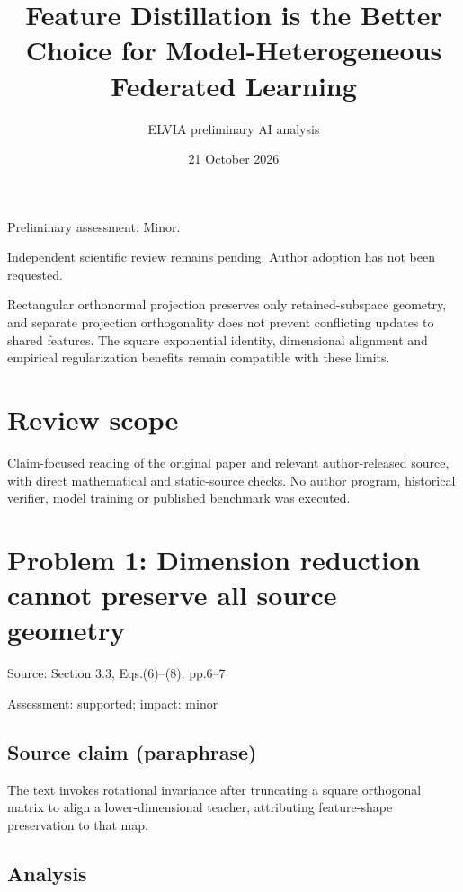 \documentclass[11pt]{article}
\begin{document}
\title{Feature Distillation is the Better Choice for Model-Heterogeneous Federated Learning}

\author{ELVIA preliminary AI analysis}\date{21 October 2026}\maketitle

Preliminary assessment: Minor.\par

Independent scientific review remains pending. Author adoption has not been requested.

Rectangular orthonormal projection preserves only retained-subspace geometry, and separate projection orthogonality does not prevent conflicting updates to shared features. The square exponential identity, dimensional alignment and empirical regularization benefits remain compatible with these limits.

\section*{Review scope}

Claim-focused reading of the original paper and relevant author-released source, with direct mathematical and static-source checks. No author program, historical verifier, model training or published benchmark was executed.

\section*{Problem 1: Dimension reduction cannot preserve all source geometry}

Source: Section 3.3, Eqs.(6)–(8), pp.6–7

Assessment: supported; impact: minor

\subsection*{Source claim (paraphrase)}

The text invokes rotational invariance after truncating a square orthogonal matrix to align a lower-dimensional teacher, attributing feature-shape preservation to that map.

\subsection*{Analysis}
\end{document}
